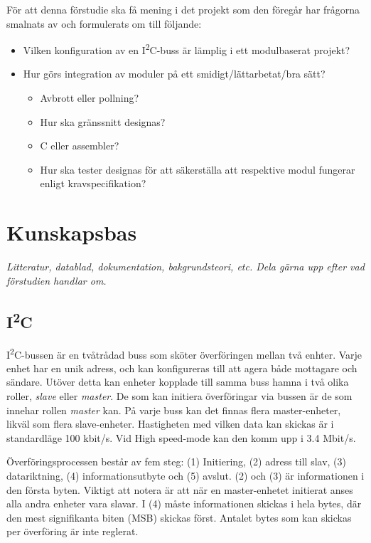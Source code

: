 \documentclass[11pt]{article}
\begin{document}
\begin{flushleft}
För att denna förstudie ska få mening i det projekt som den föregår har frågorna smalnats av och formulerats om till följande:

\begin{itemize}
	\item Vilken konfiguration av en I\textsuperscript{2}C-buss är lämplig i ett modulbaserat projekt?
	\item Hur görs integration av moduler på ett smidigt/lättarbetat/bra sätt?
	
		\begin{itemize}
			\item Avbrott eller pollning?
			\item Hur ska gränssnitt designas?
			\item C eller assembler?
			\item Hur ska tester designas för att säkerställa att respektive modul fungerar enligt kravspecifikation?
		\end{itemize}

\end{itemize}

\pagebreak

\section{Kunskapsbas}
\textit{Litteratur, datablad, dokumentation, bakgrundsteori, etc. Dela gärna upp efter vad förstudien handlar om.}

\subsection{I\textsuperscript{2}C}
I\textsuperscript{2}C-bussen är en tvåtrådad buss som sköter överföringen mellan två enhter. Varje enhet har en unik adress, och kan konfigureras till att agera både mottagare och sändare. Utöver detta kan enheter kopplade till samma buss hamna i två olika roller, \textit{slave} eller \textit{master}. De som kan initiera överföringar via bussen är de som innehar rollen \textit{master} kan. På varje buss kan det finnas flera master-enheter, likväl som flera slave-enheter. Hastigheten med vilken data kan skickas är i standardläge 100 kbit/s. Vid High speed-mode kan den komm upp i 3.4 Mbit/s.

Överföringsprocessen består av fem steg: (1) Initiering, (2) adress till slav, (3) datariktning, (4) informationsutbyte och (5) avslut. (2) och (3) är informationen i den första byten. Viktigt att notera är att när en master-enhetet initierat anses alla andra enheter vara slavar. I (4) måste informationen skickas i hela bytes, där den mest signifikanta biten (MSB) skickas först. Antalet bytes som kan skickas per överföring är inte reglerat.


\end{flushleft}
\end{document}
